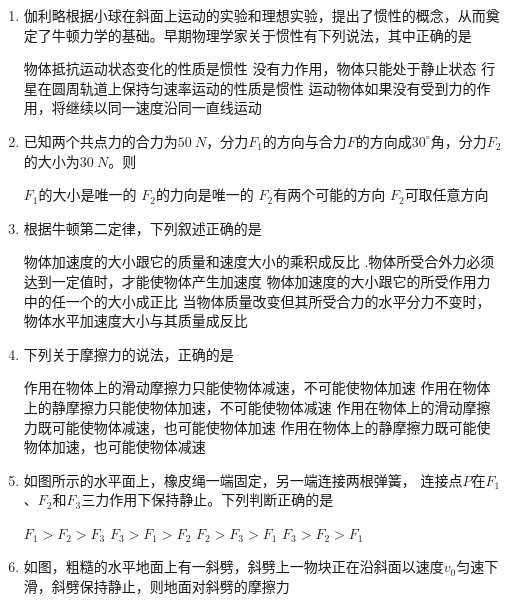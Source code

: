 \begin{enumerate}[leftmargin=0em]
\item 
{}
伽利略根据小球在斜面上运动的实验和理想实验，提出了惯性的概念，从而奠定了牛顿力学的基础。早期物理学家关于惯性有下列说法，其中正确的是  

\fourchoices
{物体抵抗运动状态变化的性质是惯性}
{没有力作用，物体只能处于静止状态}
{行星在圆周轨道上保持匀速率运动的性质是惯性}
{运动物体如果没有受到力的作用，将继续以同一速度沿同一直线运动}

\item 
{}
已知两个共点力的合力为$ 50 \ N $，分力$ F_{1} $的方向与合力$ F $的方向成$ 30 ^{ \circ } $角，分力$ F_{2} $的大小为$ 30 \ N $。则  

\fourchoices
{$ F_{1} $的大小是唯一的}
{$ F_{2} $的力向是唯一的}
{$ F_{2} $有两个可能的方向}
{$ F_{2} $可取任意方向}



\item 
{}
根据牛顿第二定律，下列叙述正确的是  

\fourchoices
{物体加速度的大小跟它的质量和速度大小的乘积成反比}
{.物体所受合外力必须达到一定值时，才能使物体产生加速度}
{物体加速度的大小跟它的所受作用力中的任一个的大小成正比}
{当物体质量改变但其所受合力的水平分力不变时，物体水平加速度大小与其质量成反比}

\item 
{}
下列关于摩擦力的说法，正确的是  

\fourchoices
{作用在物体上的滑动摩擦力只能使物体减速，不可能使物体加速}
{作用在物体上的静摩擦力只能使物体加速，不可能使物体减速}
{作用在物体上的滑动摩擦力既可能使物体减速，也可能使物体加速}
{作用在物体上的静摩擦力既可能使物体加速，也可能使物体减速}

\item 
{}
如图所示的水平面上，橡皮绳一端固定，另一端连接两根弹簧，
连接点$ P $在$ F_{1} $、$ F_{2} $和$ F_{3} $三力作用下保持静止。下列判断正确的是  
\begin{figure}[h!]
\centering

\end{figure}

\fourchoices
{$ F _ { 1 } > F _ { 2 } > F _ { 3 } $}
{$ F _ { 3 } > F _ { 1 } > F _ { 2 } $}
{$ F _ { 2 } > F _ { 3 } > F _ { 1 } $}
{$ F _ { 3 } > F _ { 2 } > F _ { 1 } $}


\item 
{}
如图，粗糙的水平地面上有一斜劈，斜劈上一物块正在沿斜面以速度$ v_{0} $匀速下滑，斜劈保持静止，则地面对斜劈的摩擦力  
\begin{figure}[h!]
\centering

\end{figure}


\end{enumerate}
